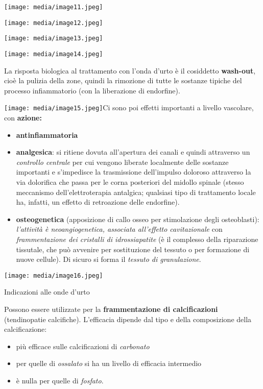 \documentclass[]{article}
\begin{document}
\texttt{[image: media/image11.jpeg]}

\texttt{[image: media/image12.jpeg]}

\texttt{[image: media/image13.jpeg]}

\texttt{[image: media/image14.jpeg]}

La risposta biologica al trattamento con l'onda d'urto è il cosiddetto
\textbf{wash-out}, cioè la pulizia della zone, quindi la rimozione di
tutte le sostanze tipiche del processo infiammatorio (con la liberazione
di endorfine).

\texttt{[image: media/image15.jpeg]}Ci
sono poi effetti importanti a livello vascolare, con \textbf{azione:}

\begin{itemize}
\item
  \textbf{antinfiammatoria}
\item
  \textbf{analgesica}: si ritiene dovuta all'apertura dei canali e
  quindi attraverso un \emph{controllo centrale} per cui vengono
  liberate localmente delle sostanze importanti e s'impedisce la
  trasmissione dell'impulso doloroso attraverso la via dolorifica che
  passa per le corna posteriori del midollo spinale (stesso meccanismo
  dell'elettroterapia antalgica; qualsiasi tipo di trattamento locale
  ha, infatti, un effetto di retroazione delle endorfine).
\item
  \textbf{osteogenetica} (apposizione di callo osseo per stimolazione
  degli osteoblasti): \emph{l'attività è neoangiogenetica, associata
  all'effetto cavitazionale} con \emph{frammentazione dei cristalli di
  idrossiapatite} (è il complesso della riparazione tissutale, che può
  avvenire per sostituzione del tessuto o per formazione di nuove
  cellule). Di sicuro si forma il \emph{tessuto di granulazione}.
\end{itemize}

\texttt{[image: media/image16.jpeg]}

Indicazioni alle onde d'urto

Possono essere utilizzate per la \textbf{frammentazione di
calcificazioni} (tendinopatie calcifiche). L'efficacia dipende dal tipo
e della composizione della calcificazione:

\begin{itemize}
\item
  più efficace sulle calcificazioni di \emph{carbonato}
\item
  per quelle di \emph{ossalato} si ha un livello di efficacia intermedio
\item
  è nulla per quelle di \emph{fosfato}.
\end{itemize}
\end{document}
